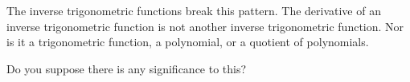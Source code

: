The inverse trigonometric functions break this pattern. The derivative
of an inverse trigonometric function is not another inverse
trigonometric function. Nor is it a trigonometric function, a
polynomial, or a quotient of polynomials.

Do you suppose there is any significance to this?











